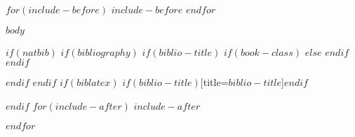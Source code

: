 \documentclass[$if(fontsize)$$fontsize$,$endif$$if(lang)$$babel-lang$,$endif$$if(papersize)$$papersize$paper,$endif$$for(classoption)$$classoption$$sep$,$endfor$]{$documentclass$}
\begin{document}




$for(include-before)$
$include-before$
$endfor$


$body$

$if(natbib)$
$if(bibliography)$
$if(biblio-title)$
$if(book-class)$
\renewcommand\bibname{$biblio-title$}
$else$
\renewcommand\refname{$biblio-title$}
$endif$
$endif$


$endif$
$endif$
$if(biblatex)$
\printbibliography$if(biblio-title)$[title=$biblio-title$]$endif$

$endif$
$for(include-after)$
$include-after$

$endfor$
\end{document}
